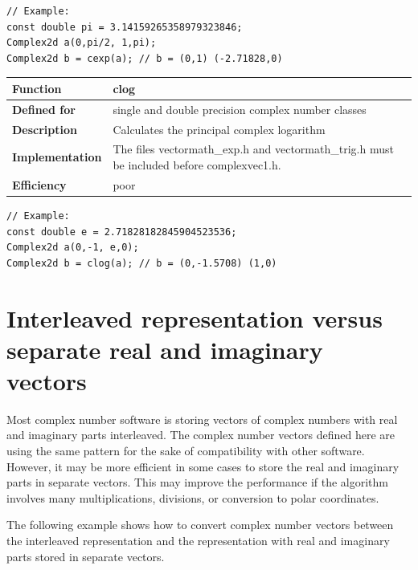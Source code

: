 \documentclass[11pt,a4paper,oneside,openright]{report}
\newcommand{\vspacesmall}{\vspace{3mm}}
\newcommand{\vspacebig}{\vspace{6mm}}
\begin{document}
\begin{lstlisting}[frame=none]
// Example:
const double pi = 3.14159265358979323846;
Complex2d a(0,pi/2, 1,pi);
Complex2d b = cexp(a); // b = (0,1) (-2.71828,0)
\end{lstlisting}
\vspacebig


\begin{tabular}{|p{28mm}|p{100mm}|}
\hline
\bfseries Function & clog \\ \hline
\bfseries Defined for & single and double precision complex number classes  \\ \hline
\bfseries Description & Calculates the principal complex logarithm \\ \hline
\bfseries Implementation & The files vectormath\_exp.h and vectormath\_trig.h
must be included before complexvec1.h. \\ \hline
\bfseries Efficiency & poor \\ \hline
\end{tabular}
\vspacesmall

\begin{lstlisting}[frame=none]
// Example:
const double e = 2.71828182845904523536;
Complex2d a(0,-1, e,0);
Complex2d b = clog(a); // b = (0,-1.5708) (1,0)
\end{lstlisting}
\vspacebig



\chapter{Interleaved representation versus separate real and imaginary vectors}\label{chap:InterleavedVsSeparate}

Most complex number software is storing vectors of complex numbers with real and imaginary parts interleaved. The complex number vectors defined here are using the same pattern for the sake of compatibility with other software. However, it may be more efficient in some cases to store the real and imaginary parts in separate vectors. This may improve the performance if the algorithm involves many multiplications, divisions, or conversion to polar coordinates.
\vspacesmall

The following example shows how to convert complex number vectors between the interleaved representation and the representation with real and imaginary parts stored in separate vectors.
\vspacesmall
\end{document}
